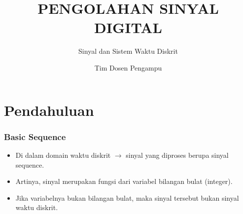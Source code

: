 \documentclass[pdflatex,compress]{beamer}
\title{PENGOLAHAN SINYAL DIGITAL}
\subtitle{Sinyal dan Sistem Waktu Diskrit}
\author{Tim Dosen Pengampu}
\begin{document}
\maketitle

\section{Pendahuluan}

\begin{frame}
	\frametitle{Basic Sequence}
	\begin{itemize}
		\item Di dalam domain waktu diskrit $\rightarrow$ sinyal yang diproses berupa sinyal sequence.
		\item Artinya, sinyal merupakan fungsi dari variabel bilangan bulat (integer).
		\item Jika variabelnya bukan bilangan bulat, maka sinyal tersebut bukan sinyal waktu diskrit.
	\end{itemize}
\end{frame}
\end{document}
